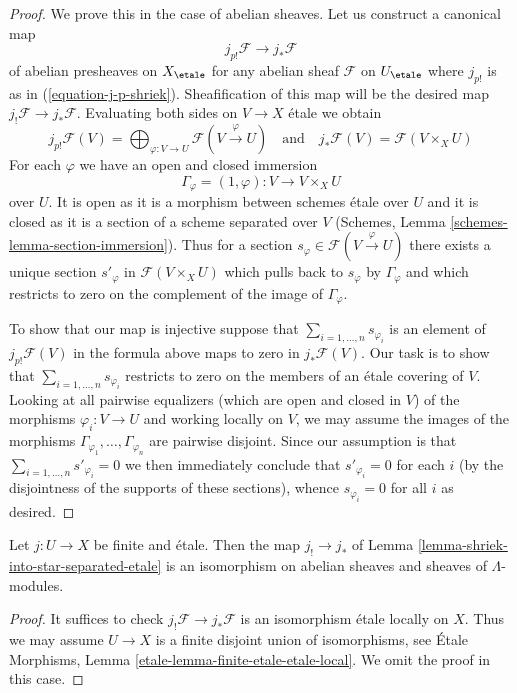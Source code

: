 \begin{proof}
We prove this in the case of abelian sheaves. Let us construct a canonical map
$$
j_{p!}\mathcal{F} \to j_*\mathcal{F}
$$
of abelian presheaves on $X_\etale$ for any abelian sheaf
$\mathcal{F}$ on $U_\etale$ where $j_{p!}$ is as in
(\ref{equation-j-p-shriek}). Sheafification of this map will
be the desired map $j_!\mathcal{F} \to j_*\mathcal{F}$.
Evaluating both sides on $V \to X$ \'etale we obtain
$$
j_{p!}\mathcal{F}(V) =
\bigoplus\nolimits_{\varphi : V \to U} \mathcal{F}(V \xrightarrow{\varphi} U)
\quad\text{and}\quad
j_*\mathcal{F}(V) = \mathcal{F}(V \times_X U)
$$
For each $\varphi$ we have an open and closed immersion
$$
\Gamma_\varphi = (1, \varphi) : V \longrightarrow V \times_X U
$$
over $U$. It is open as it is a morphism between schemes \'etale
over $U$ and it is closed as it is a section of a scheme separated
over $V$ (Schemes, Lemma \ref{schemes-lemma-section-immersion}).
Thus for a section $s_\varphi \in \mathcal{F}(V \xrightarrow{\varphi} U)$
there exists a unique section $s'_\varphi$ in $\mathcal{F}(V \times_X U)$
which pulls back to $s_\varphi$ by $\Gamma_\varphi$
and which restricts to zero on the complement of the image of $\Gamma_\varphi$.

\medskip\noindent
To show that our map is injective suppose that
$\sum_{i = 1, \ldots, n} s_{\varphi_i}$ is an element of
$j_{p!}\mathcal{F}(V)$ in the formula above maps to zero
in $j_*\mathcal{F}(V)$. Our task is to show that
$\sum_{i = 1, \ldots, n} s_{\varphi_i}$ restricts to zero
on the members of an \'etale covering of $V$.
Looking at all pairwise equalizers
(which are open and closed in $V$) of the morphisms
$\varphi_i : V \to U$ and working locally on $V$, we
may assume the images of the morphisms
$\Gamma_{\varphi_1}, \ldots, \Gamma_{\varphi_n}$
are pairwise disjoint. Since our assumption is that
$\sum_{i = 1, \ldots, n} s'_{\varphi_i} = 0$
we then immediately conclude that $s'_{\varphi_i} = 0$
for each $i$ (by the disjointness of the supports of these
sections), whence $s_{\varphi_i} = 0$ for all $i$ as desired.
\end{proof}

\begin{lemma}
\label{lemma-shriek-equals-star-finite-etale}
Let $j : U \to X$ be finite and \'etale. Then the map
$j_! \to j_*$ of Lemma \ref{lemma-shriek-into-star-separated-etale}
is an isomorphism
on abelian sheaves and sheaves of $\Lambda$-modules.
\end{lemma}

\begin{proof}

\medskip\noindent
It suffices to check $j_!\mathcal{F} \to j_*\mathcal{F}$
is an isomorphism \'etale locally on $X$.
Thus we may assume $U \to X$ is a finite disjoint union
of isomorphisms, see
\'Etale Morphisms, Lemma \ref{etale-lemma-finite-etale-etale-local}.
We omit the proof in this case.
\end{proof}

